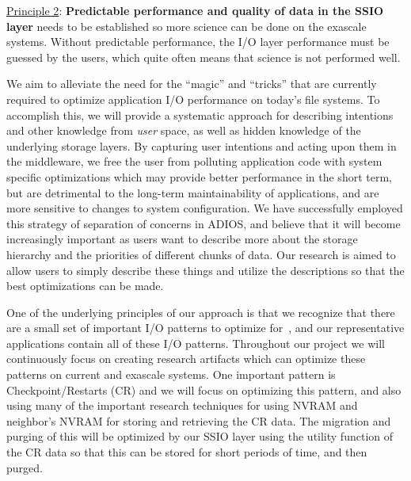 \underline{Principle 2}: {\bf Predictable performance and quality of data in the SSIO layer} needs to be
established so more science can be done on the exascale systems. Without
predictable performance, the I/O layer performance must be guessed by the
users, which quite often means that science is not performed well.

We aim to alleviate the need for the ``magic'' and ``tricks''
that are currently required to optimize application I/O performance
on today's file systems. To accomplish this, we will provide a systematic
approach for describing intentions and other knowledge from {\it user}
space, as well as hidden knowledge of the underlying storage layers.
By capturing user intentions and acting upon them in the middleware, we
free the user from polluting application code with system specific
optimizations which may provide better performance in the short term,
but are detrimental to the long-term maintainability of applications, and
are more sensitive to changes to system configuration. We have successfully
employed this strategy of separation of concerns in ADIOS, and believe that
it will become increasingly important as users want to describe more about
the storage hierarchy and the priorities of different chunks of data. 
Our research is aimed to allow users to simply describe these things and
utilize the descriptions so that the best optimizations can be made.

One of the underlying principles of our approach is that we recognize that there are a small set
of important I/O patterns to optimize for~\cite{lofstead2011six,polte2009and,tian2011edo,tian2012system},
and our representative applications contain all of these I/O patterns. Throughout our project
we will continuously focus on creating research artifacts which can optimize these patterns on current  and
exascale systems.  One important pattern is Checkpoint/Restarts (CR) and we will focus on optimizing this pattern,
 and also using many of the important research techniques for using NVRAM and neighbor's NVRAM for storing and retrieving
the CR data. The migration and purging of this will be optimized by our SSIO layer using the utility function of the CR data so that this can  be stored for short periods of time, and then purged. 




